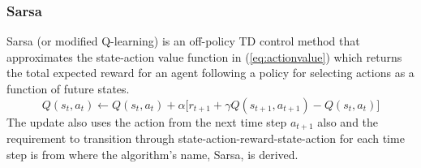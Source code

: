 \subsubsection{Sarsa}
\label{sec:sarsa}
Sarsa (or modified Q-learning) is an off-policy TD control method that
approximates the state-action value function in (\ref{eq:actionvalue}) which
returns the total expected reward for an agent following a policy for selecting
actions as a function of future states.
\begin{equation}
\label{eq:sarsa}
Q(s_t,a_t) \leftarrow Q(s_t,a_t) + \alpha \bigl[r_{t+1} + \gamma
Q(s_{t+1},a_{t+1}) - Q(s_t,a_t)\bigr]
\end{equation}
The update also uses the action from the next time step $a_{t+1}$ also and the
requirement to transition through state-action-reward-state-action for each time step is from where the
algorithm's name, Sarsa, is derived.


